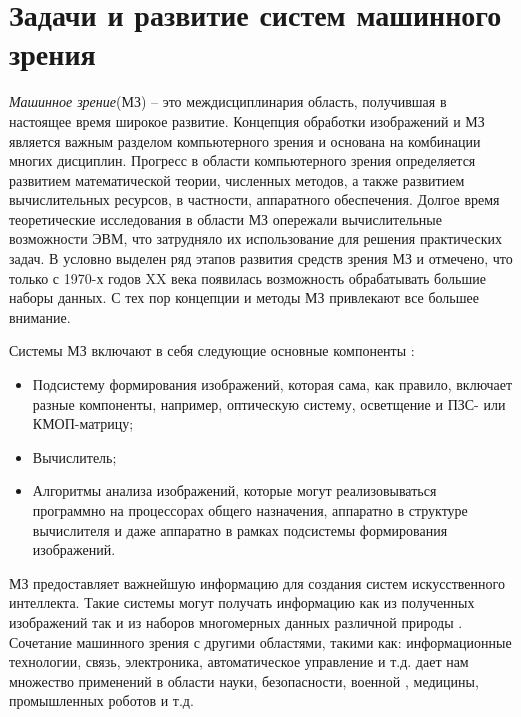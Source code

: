
\section{Задачи и развитие систем машинного зрения} \label{chapter1.1}

\emph{Машинное зрение}(МЗ) -- это междисциплинария область, получившая в настоящее время широкое развитие. Концепция обработки изображений и МЗ является важным разделом компьютерного зрения и основана на комбинации многих дисциплин. Прогресс в области компьютерного зрения определяется развитием математической теории, численных методов, а также развитием вычислительных ресурсов, в частности, аппаратного обеспечения. Долгое время теоретические исследования в области МЗ опережали вычислительные возможности ЭВМ, что затрудняло их использование для решения практических задач. В \cite{Paragios2008} условно выделен ряд этапов развития средств зрения МЗ и отмечено, что только с 1970-х годов XX века появилась возможность обрабатывать большие наборы данных. С тех пор концепции и методы МЗ привлекают все большее внимание.

Системы МЗ включают в себя следующие основные компоненты \cite{Rosenfeld2000}:
\begin{itemize}
	\item Подсистему формирования изображений, которая сама, как правило, включает разные компоненты, например, оптическую систему, осветщение и ПЗС- или КМОП-матрицу;
	\item Вычислитель;
	\item Алгоритмы анализа изображений, которые могут реализовываться программно на процессорах общего назначения, аппаратно в структуре вычислителя и даже аппаратно в рамках подсистемы формирования изображений.
\end{itemize}

МЗ предоставляет важнейшую информацию для создания систем искусственного интеллекта. Такие системы могут получать информацию как из полученных  изображений так и из наборов многомерных данных различной природы \cite{Fan2013}. Сочетание машинного зрения с другими областями, такими как: информационные технологии, связь, электроника, автоматическое управление и т.д. дает нам множество применений в области науки, безопасности, военной , медицины, промышленных роботов и т.д.

